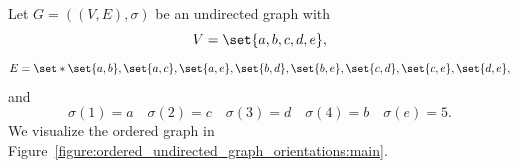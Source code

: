Let $G = ((V, E), \sigma)$ be an undirected graph with
\[
	V = \set{a,b,c,d,e},
\]
\[
  E = \set*{\set{a, b}, \set{a, c}, \set{a, e}, \set{b, d}, \set{b, e}, \set{c, d}, \set{c, e}, \set{d,e}},
\]
and
\[
  \sigma(1) = a \quad  \sigma(2) = c \quad \sigma(3) = d \quad \sigma(4) = b \quad \sigma(e) = 5.
\]
We visualize the ordered graph in Figure~\ref{figure:ordered_undirected_graph_orientations:main}.
